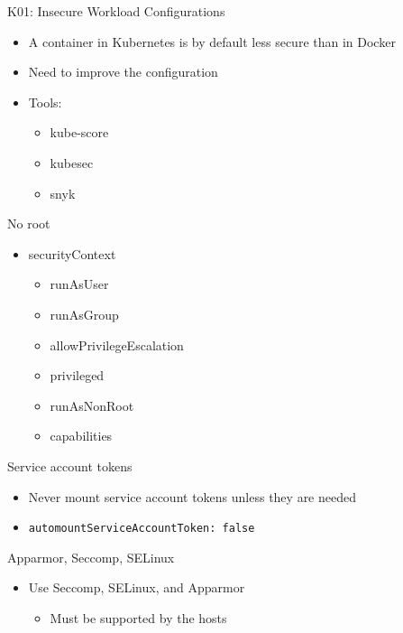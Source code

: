 \documentclass{dcpresentation}
\begin{document}
\begin{frame}{K01: Insecure Workload Configurations}
  \begin{itemize}
  \item A container in Kubernetes is by default less secure than in Docker
  \item Need to improve the configuration
  \item Tools:
  \begin{itemize}
   \item kube-score
   \item kubesec
   \item snyk
  \end{itemize}
 \end{itemize}
\end{frame}


\begin{frame}{No root}
  \begin{itemize}
    \item securityContext
    \begin{itemize}
      \item runAsUser
      \item runAsGroup
      \item allowPrivilegeEscalation
      \item privileged
      \item runAsNonRoot
      \item capabilities
    \end{itemize}
  \end{itemize}
\end{frame}

\begin{frame}{Service account tokens}
  \begin{itemize}
    \item Never mount service account tokens unless they are needed
    \item \texttt{automountServiceAccountToken: false}
  \end{itemize}
\end{frame}

\begin{frame}{Apparmor, Seccomp, SELinux}
  \begin{itemize}
    \item Use Seccomp, SELinux, and Apparmor
    \begin{itemize}
     \item Must be supported by the hosts
    \end{itemize}
  \end{itemize}
\end{frame}
\end{document}
